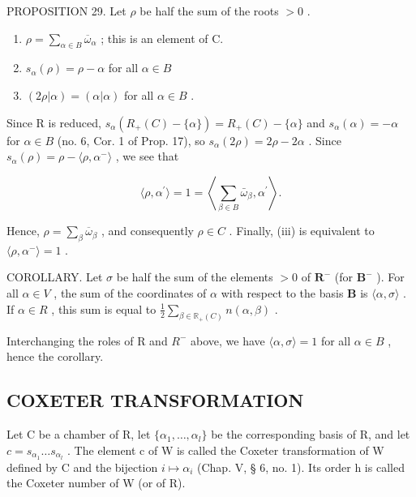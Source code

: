 PROPOSITION 29. Let \(\rho\) be half the sum of the roots \(>0\) .

\begin{enumerate}
\def\labelenumi{(\roman{enumi})}
\item
  \(\rho = \sum_{\alpha \in B} \overline{\omega}_{\alpha}\) ; this is an element of C.
\item
  \(s_{\alpha}(\rho) = \rho -\alpha\) for all \(\alpha \in B\)
\item
  \((2\rho |\alpha) = (\alpha |\alpha)\) for all \(\alpha \in B\) .
\end{enumerate}

Since R is reduced, \(s_{\alpha}(R_{+}(C) - \{\alpha\}) = R_{+}(C) - \{\alpha\}\) and \(s_{\alpha}(\alpha) = -\alpha\) for \(\alpha \in B\) (no. 6, Cor. 1 of Prop. 17), so \(s_{\alpha}(2\rho) = 2\rho - 2\alpha\) . Since \(s_{\alpha}(\rho) = \rho - \langle \rho, \alpha^{-} \rangle\) , we see that

\[
\langle \rho , \alpha^ {\prime} \rangle = 1 = \left\langle \sum_ {\beta \in B} \bar {\omega} _ {\beta}, \alpha^ {\prime} \right\rangle .
\]

Hence, \(\rho = \sum_{\beta} \overline{\omega}_{\beta}\) , and consequently \(\rho \in C\) . Finally, (iii) is equivalent to \(\langle \rho, \alpha^{-} \rangle = 1\) .

COROLLARY. Let \(\sigma\) be half the sum of the elements \(>0\) of \(\mathbf{R}^{-}\) (for \(\mathbf{B}^{-}\) ). For all \(\alpha \in V\) , the sum of the coordinates of \(\alpha\) with respect to the basis \(\mathbf{B}\) is \(\langle \alpha, \sigma \rangle\) . If \(\alpha \in R\) , this sum is equal to \(\frac{1}{2} \sum_{\beta \in \mathbb{R}_{+}(C)} n(\alpha, \beta)\) .

Interchanging the roles of R and \(R^{-}\) above, we have \(\langle\alpha,\sigma\rangle=1\) for all \(\alpha\in B\) , hence the corollary.

\subsection{COXETER TRANSFORMATION}

Let C be a chamber of R, let \(\{\alpha_{1},\ldots,\alpha_{l}\}\) be the corresponding basis of R, and let \(c=s_{\alpha_{1}}\ldots s_{\alpha_{l}}\) . The element c of W is called the Coxeter transformation of W defined by C and the bijection \(i\mapsto\alpha_{i}\) (Chap. V, § 6, no. 1). Its order h is called the Coxeter number of W (or of R).

